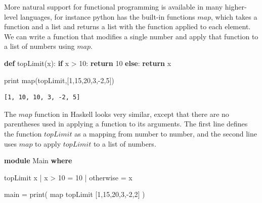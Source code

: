 \documentclass[]{article}
\newenvironment{Shaded}{}{}
\newcommand{\KeywordTok}[1]{\textcolor[rgb]{0.00,0.44,0.13}{\textbf{{#1}}}}
\newcommand{\DataTypeTok}[1]{\textcolor[rgb]{0.56,0.13,0.00}{{#1}}}
\newcommand{\DecValTok}[1]{\textcolor[rgb]{0.25,0.63,0.44}{{#1}}}
\newcommand{\FunctionTok}[1]{\textcolor[rgb]{0.02,0.16,0.49}{{#1}}}
\newcommand{\NormalTok}[1]{{#1}}
\begin{document}
More natural support for functional programming is available in many
higher-level languages, for instance python has the built-in functions
\(map\), which takes a function and a list and returns a list with the
function applied to each element. We can write a function that modifies
a single number and apply that function to a list of numbers using
\(map\).

\singlespacing

\begin{Shaded}
\begin{Highlighting}[]
  \KeywordTok{def} \NormalTok{topLimit(x):}
      \KeywordTok{if} \NormalTok{x > }\DecValTok{10}\NormalTok{:}
          \KeywordTok{return} \DecValTok{10}
      \KeywordTok{else}\NormalTok{:}
          \KeywordTok{return} \NormalTok{x}

  \DataTypeTok{print} \DataTypeTok{map}\NormalTok{(topLimit,[}\DecValTok{1}\NormalTok{,}\DecValTok{15}\NormalTok{,}\DecValTok{20}\NormalTok{,}\DecValTok{3}\NormalTok{,-}\DecValTok{2}\NormalTok{,}\DecValTok{5}\NormalTok{])}
\end{Highlighting}
\end{Shaded}

\begin{verbatim}
[1, 10, 10, 3, -2, 5]
\end{verbatim}

\doublespacing

The \(map\) function in Haskell looks very similar, except that there
are no parentheses used in applying a function to its arguments. The
first line defines the function \(topLimit\) as a mapping from number to
number, and the second line uses \(map\) to apply \(topLimit\) to a list
of numbers.

\singlespacing

\begin{Shaded}
\begin{Highlighting}[]
\KeywordTok{module} \DataTypeTok{Main} \KeywordTok{where}

  \NormalTok{topLimit x}
    \FunctionTok{|} \NormalTok{x }\FunctionTok{>} \DecValTok{10}    \FunctionTok{=} \DecValTok{10} 
    \FunctionTok{|} \NormalTok{otherwise }\FunctionTok{=} \NormalTok{x  }

  \NormalTok{main }\FunctionTok{=} \NormalTok{print( map topLimit [}\DecValTok{1}\NormalTok{,}\DecValTok{15}\NormalTok{,}\DecValTok{20}\NormalTok{,}\DecValTok{3}\NormalTok{,}\FunctionTok{-}\DecValTok{2}\NormalTok{,}\DecValTok{2}\NormalTok{] )}
\end{Highlighting}
\end{Shaded}
\end{document}
